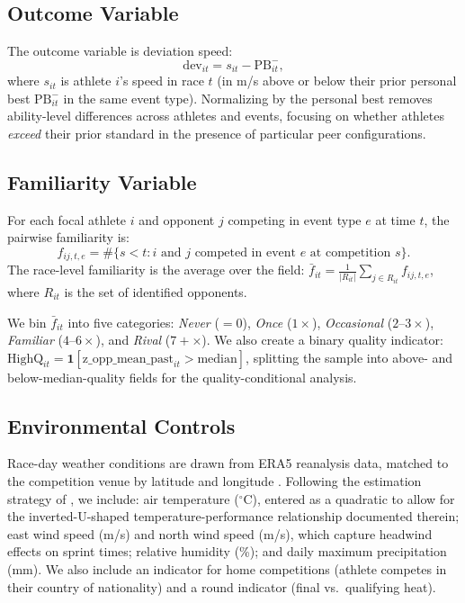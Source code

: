 \documentclass[12pt]{article}
\theoremstyle{definition}
\theoremstyle{remark}
\begin{document}
\subsection{Outcome Variable}

The outcome variable is deviation speed:
\begin{equation}
\text{dev}_{it} = s_{it} - \text{PB}_{it}^-,
\end{equation}
where $s_{it}$ is athlete $i$'s speed in race $t$ (in m/s above or below their
prior personal best $\text{PB}_{it}^-$ in the same event type).
Normalizing by the personal best removes ability-level differences across athletes
and events, focusing on whether athletes \textit{exceed} their prior standard
in the presence of particular peer configurations.

\subsection{Familiarity Variable}

For each focal athlete $i$ and opponent $j$ competing in event type $e$
at time $t$, the pairwise familiarity is:
\begin{equation}
f_{ij,t,e} = \#\{s < t : i \text{ and } j \text{ competed in event }e\text{ at competition }s\}.
\end{equation}
The race-level familiarity is the average over the field:
$\bar{f}_{it} = \frac{1}{|R_{it}|}\sum_{j \in R_{it}} f_{ij,t,e}$,
where $R_{it}$ is the set of identified opponents.

We bin $\bar{f}_{it}$ into five categories:
\textit{Never} ($=0$), \textit{Once} ($1\times$), \textit{Occasional} ($2$--$3\times$),
\textit{Familiar} ($4$--$6\times$), and \textit{Rival} ($7+\times$).
We also create a binary quality indicator:
$\text{HighQ}_{it} = \mathbf{1}[\text{z\_opp\_mean\_past}_{it} > \text{median}]$,
splitting the sample into above- and below-median-quality fields for the
quality-conditional analysis.

\subsection{Environmental Controls}

Race-day weather conditions are drawn from ERA5 reanalysis data,
matched to the competition venue by latitude and longitude \citep{AragonRezazadeh2025}.
Following the estimation strategy of \citet{AragonRezazadeh2025}, we include:
air temperature ($^\circ$C), entered as a quadratic to allow for the
inverted-U-shaped temperature-performance relationship documented therein;
east wind speed (m/s) and north wind speed (m/s), which capture headwind
effects on sprint times; relative humidity (\%); and
daily maximum precipitation (mm).
We also include an indicator for home competitions (athlete competes in
their country of nationality) and a round indicator (final vs.\ qualifying heat).
\end{document}
